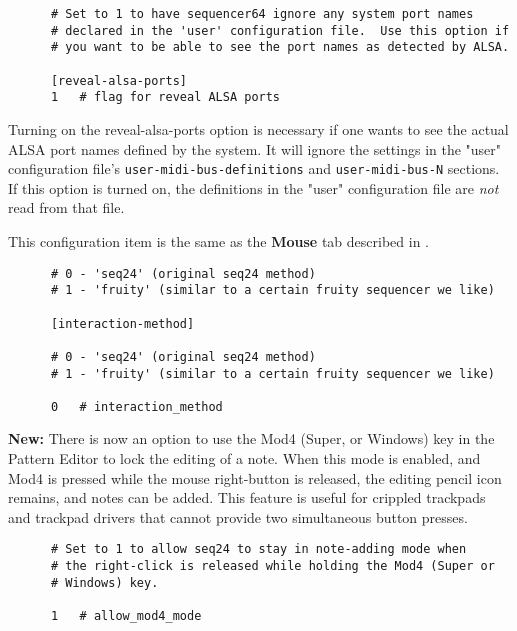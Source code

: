    \begin{verbatim}
      # Set to 1 to have sequencer64 ignore any system port names
      # declared in the 'user' configuration file.  Use this option if
      # you want to be able to see the port names as detected by ALSA.

      [reveal-alsa-ports]
      1   # flag for reveal ALSA ports
   \end{verbatim}

   Turning on the reveal-alsa-ports option is necessary if one
   wants to see the actual ALSA port names defined by the system.
   It will ignore the settings in the "user" configuration file's
   \texttt{user-midi-bus-definitions} and \texttt{user-midi-bus-N} sections.
   If this option is turned on, the definitions in the
   "user" configuration file are \textsl{not} read from that file.

   This configuration item is the same as the 
   \textbf{Mouse} tab described in
   .

   \begin{verbatim}
      # 0 - 'seq24' (original seq24 method)
      # 1 - 'fruity' (similar to a certain fruity sequencer we like)

      [interaction-method]

      # 0 - 'seq24' (original seq24 method)
      # 1 - 'fruity' (similar to a certain fruity sequencer we like)

      0   # interaction_method
   \end{verbatim}

   \textbf{New:}
   There is now an option to use the Mod4 (Super, or Windows) key in the
   Pattern Editor to lock the editing of a note.  When this mode is enabled,
   and Mod4 is pressed while the mouse right-button is released, the
   editing pencil icon remains, and notes can be added.  This feature is
   useful for crippled trackpads and trackpad drivers that cannot provide
   two simultaneous button presses.

   \begin{verbatim}
      # Set to 1 to allow seq24 to stay in note-adding mode when
      # the right-click is released while holding the Mod4 (Super or
      # Windows) key.

      1   # allow_mod4_mode
   \end{verbatim}

